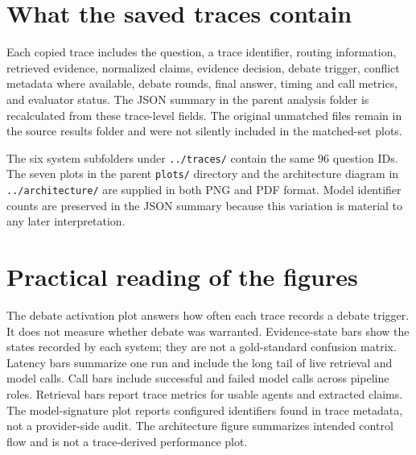 \documentclass[conference]{IEEEtran}
\begin{document}
\appendices
\section{What the saved traces contain}
Each copied trace includes the question, a trace identifier, routing information, retrieved evidence, normalized claims, evidence decision, debate trigger, conflict metadata where available, debate rounds, final answer, timing and call metrics, and evaluator status. The JSON summary in the parent analysis folder is recalculated from these trace-level fields. The original unmatched files remain in the source results folder and were not silently included in the matched-set plots.

The six system subfolders under \texttt{../traces/} contain the same 96 question IDs. The seven plots in the parent \texttt{plots/} directory and the architecture diagram in \texttt{../architecture/} are supplied in both PNG and PDF format. Model identifier counts are preserved in the JSON summary because this variation is material to any later interpretation.

\section{Practical reading of the figures}
The debate activation plot answers how often each trace records a debate trigger. It does not measure whether debate was warranted. Evidence-state bars show the states recorded by each system; they are not a gold-standard confusion matrix. Latency bars summarize one run and include the long tail of live retrieval and model calls. Call bars include successful and failed model calls across pipeline roles. Retrieval bars report trace metrics for usable agents and extracted claims. The model-signature plot reports configured identifiers found in trace metadata, not a provider-side audit. The architecture figure summarizes intended control flow and is not a trace-derived performance plot.



\end{document}
